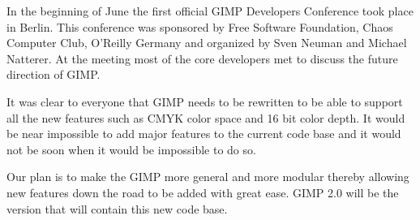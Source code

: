In the beginning of June the first official GIMP Developers Conference took place in Berlin. This conference was sponsored by Free Software Foundation, Chaos Computer Club, O'Reilly Germany and organized by Sven Neuman and Michael Natterer. At the meeting most of the core developers met to discuss the future direction of GIMP.

It was clear to everyone that GIMP needs to be rewritten to be able to support all the new features such as CMYK color space and 16 bit color depth. It would be near impossible to add major features to the current code base and it would not be soon when it would be impossible to do so. 

Our plan is to make the GIMP more general and more modular thereby allowing new features down the road to be added with great ease. GIMP 2.0 will be the version that will contain this new code base.




